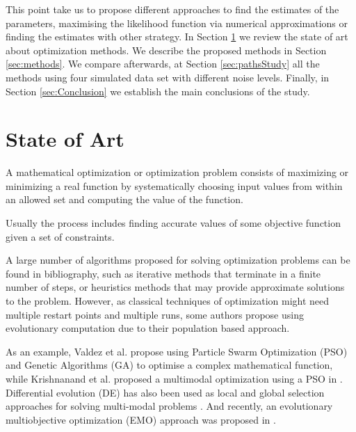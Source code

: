 \documentclass{sig-alternate}
\begin{document}
This point take us to propose different approaches to find the estimates of the parameters, maximising the likelihood function via numerical approximations or finding the estimates with other strategy. In Section \ref{sec:soa} we review the state of art about optimization methods. We describe the proposed methods in Section \ref{sec:methods}. We compare afterwards, at Section \ref{sec:pathsStudy} all the methods using four simulated data set with different noise levels. Finally, in Section \ref{sec:Conclusion} we establish the main conclusions of the study.

\section{State of Art}
\label{sec:soa}

A mathematical optimization or optimization problem \cite{Minoux1986}
consists of maximizing or minimizing a real function by systematically
choosing input values from within an allowed set and computing the
value of the function.  %

Usually the process includes finding accurate values of some objective
function given a set of constraints. %


A large number of algorithms proposed for solving optimization
problems can be found in bibliography, %
 such as iterative methods that terminate in a finite number of steps, or heuristics methods that may provide approximate solutions to the problem.
However, as classical techniques of optimization might need multiple
restart points and multiple runs, some authors propose using
evolutionary computation \cite{Pattnaik2001} due to their population
based approach. %

As an example, Valdez et al. \cite{Valdez2007,Valdez2007b,Valdez2008}
propose using Particle Swarm Optimization (PSO) and Genetic Algorithms
(GA) to optimise a complex mathematical function, while Krishnanand et
al. proposed a multimodal optimization using a PSO in
\cite{Krishnanand2009}. Differential evolution (DE) has also been used
as local and global selection approaches for solving multi-modal
problems \cite{Ronkkonen2009}. And recently, an evolutionary
multiobjective optimization (EMO) approach was proposed in
\cite{Deb2010,Saha2010}. %
\end{document}
